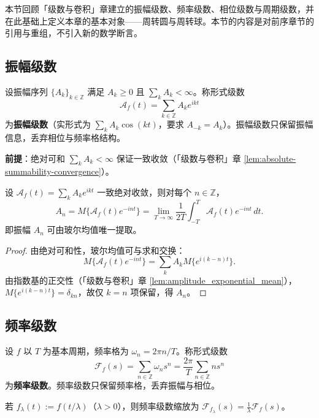 本节回顾「级数与卷积」章建立的振幅级数、频率级数、相位级数与周期级数，并在此基础上定义本章的基本对象——周转圆与周转球。本节的内容是对前序章节的引用与重组，不引入新的数学断言。

\subsection{振幅级数}

\begin{definition}[振幅级数（回顾）]\label{def:dyn_amplitude_series}
设振幅序列 $\{A_k\}_{k\in\mathbb Z}$ 满足 $A_k\ge 0$ 且 $\sum_k A_k<\infty$。称形式级数
\[
\mathcal A_f(t)=\sum_{k\in\mathbb Z}A_k e^{ikt}
\]
为\textbf{振幅级数}（实形式为 $\sum_k A_k\cos(kt)$，要求 $A_{-k}=A_k$）。振幅级数只保留振幅信息，丢弃相位与频率格结构。

\textbf{前提}：绝对可和 $\sum_k A_k<\infty$ 保证一致收敛（「级数与卷积」章 \cref{lem:absolute-summability-convergence}）。
\end{definition}

\begin{proposition}[振幅级数的玻尔均值系数公式（回顾）]\label{prop:dyn_amplitude_coefficient}
设 $\mathcal A_f(t)=\sum_k A_k e^{ikt}$ 一致绝对收敛，则对每个 $n\in\mathbb Z$，
\[
A_n=M\{\mathcal A_f(t)e^{-int}\}=\lim_{T\to\infty}\frac{1}{2T}\int_{-T}^{T}\mathcal A_f(t)e^{-int}\,dt.
\]
即振幅 $A_n$ 可由玻尔均值唯一提取。
\end{proposition}

\begin{proof}
由绝对可和性，玻尔均值可与求和交换：
\[
M\{\mathcal A_f(t)e^{-int}\}=\sum_k A_k M\{e^{i(k-n)t}\}.
\]
由指数基的正交性（「级数与卷积」章 \cref{lem:amplitude_exponential_mean}），$M\{e^{i(k-n)t}\}=\delta_{kn}$，故仅 $k=n$ 项保留，得 $A_n$。
\end{proof}

\subsection{频率级数}

\begin{definition}[频率级数（回顾）]\label{def:dyn_frequency_series}
设 $f$ 以 $T$ 为基本周期，频率格为 $\omega_n=2\pi n/T$。称形式级数
\[
\mathcal F_f(s)=\sum_{n\in\mathbb Z}\omega_n s^n=\frac{2\pi}{T}\sum_{n\in\mathbb Z}n s^n
\]
为\textbf{频率级数}。频率级数只保留频率格，丢弃振幅与相位。
\end{definition}

\begin{proposition}[频率级数与周期缩放（回顾）]\label{prop:dyn_frequency_scaling}
若 $f_\lambda(t):=f(t/\lambda)$（$\lambda>0$），则频率级数缩放为 $\mathcal F_{f_\lambda}(s)=\frac{1}{\lambda}\mathcal F_f(s)$。
\end{proposition}

